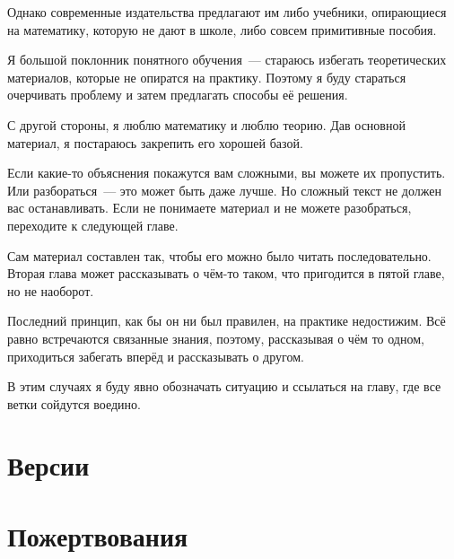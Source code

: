 Однако современные издательства предлагают им либо учебники, опирающиеся на математику, которую не дают в школе, либо совсем примитивные пособия.

Я большой поклонник понятного обучения~--- стараюсь избегать теоретических материалов, которые не опиратся на практику. Поэтому я буду стараться очерчивать проблему и затем предлагать способы её решения.

С другой стороны, я люблю математику и люблю теорию.
Дав основной материал, я постараюсь закрепить его хорошей базой.

Если какие-то объяснения покажутся вам сложными, вы можете их пропустить.
Или разбораться~--- это может быть даже лучше.
Но сложный текст не должен вас останавливать.
Если не понимаете материал и не можете разобраться, переходите к следующей главе.

Сам материал составлен так, чтобы его можно было читать последовательно.
Вторая глава может рассказывать о чём-то таком, что пригодится в пятой главе, но не наоборот.

Последний принцип, как бы он ни был правилен, на практике недостижим. Всё равно встречаются связанные знания, поэтому, рассказывая о чём то одном, приходиться забегать вперёд и рассказывать о другом.

В этим случаях я буду явно обозначать ситуацию и ссылаться на главу, где все ветки сойдутся воедино.

\section{Версии}

\section{Пожертвования}
